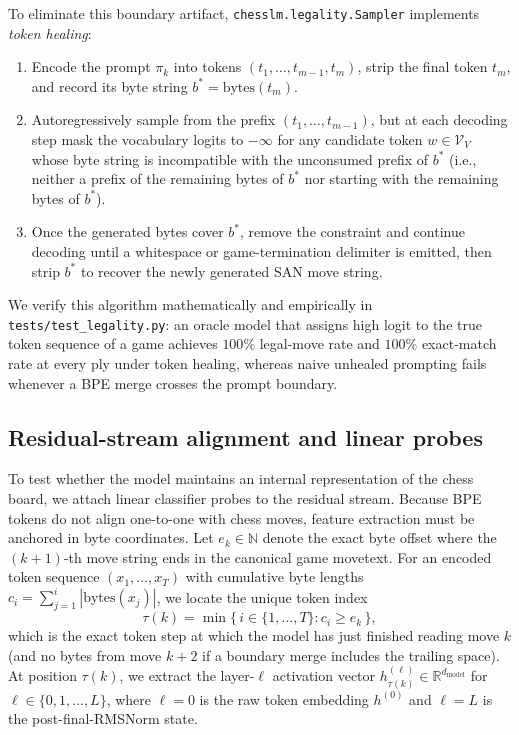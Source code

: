 \documentclass[11pt]{article}
\begin{document}
To eliminate this boundary artifact, \texttt{chesslm.legality.Sampler} implements \emph{token healing}:
\begin{enumerate}
\item Encode the prompt $\pi_k$ into tokens $(t_1, \dots, t_{m-1}, t_m)$, strip the final token $t_m$, and record its byte string $b^\ast = \mathrm{bytes}(t_m)$.
\item Autoregressively sample from the prefix $(t_1, \dots, t_{m-1})$, but at each decoding step mask the vocabulary logits to $-\infty$ for any candidate token $w \in \mathcal{V}_V$ whose byte string is incompatible with the unconsumed prefix of $b^\ast$ (i.e., neither a prefix of the remaining bytes of $b^\ast$ nor starting with the remaining bytes of $b^\ast$).
\item Once the generated bytes cover $b^\ast$, remove the constraint and continue decoding until a whitespace or game-termination delimiter is emitted, then strip $b^\ast$ to recover the newly generated SAN move string.
\end{enumerate}
We verify this algorithm mathematically and empirically in \texttt{tests/test\_legality.py}: an oracle model that assigns high logit to the true token sequence of a game achieves $100\%$ legal-move rate and $100\%$ exact-match rate at every ply under token healing, whereas naive unhealed prompting fails whenever a BPE merge crosses the prompt boundary.

\subsection{Residual-stream alignment and linear probes}
\label{sec:probing-math}

To test whether the model maintains an internal representation of the chess board, we attach linear classifier probes \citep{alain2017probes} to the residual stream. Because BPE tokens do not align one-to-one with chess moves, feature extraction must be anchored in byte coordinates. Let $e_k \in \mathbb{N}$ denote the exact byte offset where the $(k+1)$-th move string ends in the canonical game movetext. For an encoded token sequence $(x_1, \dots, x_T)$ with cumulative byte lengths $c_i = \sum_{j=1}^i |\mathrm{bytes}(x_j)|$, we locate the unique token index
\begin{equation}
\tau(k) = \min\{\, i \in \{1, \dots, T\} : c_i \ge e_k \,\},
\label{eq:tau}
\end{equation}
which is the exact token step at which the model has just finished reading move $k$ (and no bytes from move $k+2$ if a boundary merge includes the trailing space). At position $\tau(k)$, we extract the layer-$\ell$ activation vector $h^{(\ell)}_{\tau(k)} \in \mathbb{R}^{d_{\mathrm{model}}}$ for $\ell \in \{0, 1, \dots, L\}$, where $\ell=0$ is the raw token embedding $h^{(0)}$ and $\ell=L$ is the post-final-RMSNorm state.
\end{document}
